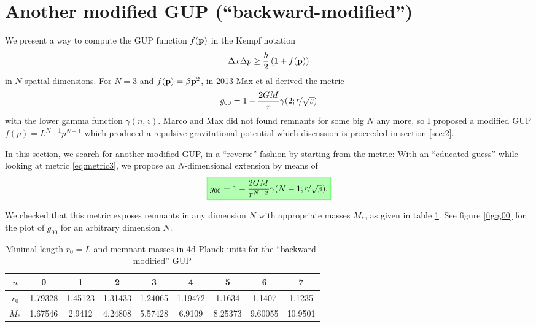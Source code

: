 \documentclass[10pt,a4paper]{article}
\newcommand{\highlight}[1]{%
   \fcolorbox{green}{green!30}{$\displaystyle#1$}%
}
\begin{document}
\section{Another modified GUP (``backward-modified'')}\label{sec:1}
We present a way to compute the GUP function $f(\mathbf{ p })$ in the Kempf notation
\begin{equation}
\Delta x \Delta p \geq \frac{\hbar}{2} \left( 1 + f(\mathbf{ p }) \right)
\end{equation}
in $N$ spatial dimensions. For $N=3$ and $f(\mathbf{ p })=\beta \mathbf{ p }^2$, in 2013 Max et al \cite{isi2013} derived the metric
\begin{equation}\label{eq:metric3}
g_{00} = 1 - \frac{2GM}{r} \gamma(2; \nicefrac{r}{\sqrt{\beta}})
\end{equation}
with the lower gamma function $\gamma(n,z)$. Marco and Max did not found remnants for some big $N$ any more, so I proposed a modified GUP $f(p)=L^{N-1}p^{N-1}$ which produced a repulsive gravitational potential which discussion is proceeded in section \ref{sec:2}.

In this section, we search for another modified GUP, in a ``reverse'' fashion by starting from the metric: With an ``educated guess'' while looking at metric \eqref{eq:metric3}, we propose an $N$-dimensional extension by means of
\begin{equation}\label{eq:metric}
\highlight{
g_{00} = 1 - \frac{2GM}{r^{N-2}} \gamma(N-1; \rbb).
}%
\end{equation}

We checked that this metric exposes remnants in any dimension $N$ with appropriate masses $M_*$, as given in table \ref{table:Length-scales}. See figure \ref{fig:g00} for the plot of $g_{00}$ for an arbitrary dimension $N$.

\begin{table}[b!]
\begin{center}
\begin{tabular}{ccccccccc}
\firsthline
 $n$ & 0 & 1 & 2 & 3 & 4 & 5 & 6 & 7 \\
 \hline
 $r_0$ & 1.79328 & 1.45123 & 1.31433 & 1.24065 & 1.19472 & 1.1634 & 1.1407 & 1.1235 \\
 $M_*$ & 1.67546 & 2.9412 & 4.24808 & 5.57428 & 6.9109 & 8.25373 & 9.60055 & 10.9501 \\
   \hline
\end{tabular}
\end{center}
\caption{Minimal length $r_0=L$ and memnant masses in 4d Planck units for the ``backward-modified'' GUP}\label{table:Length-scales}
\end{table}
\end{document}
